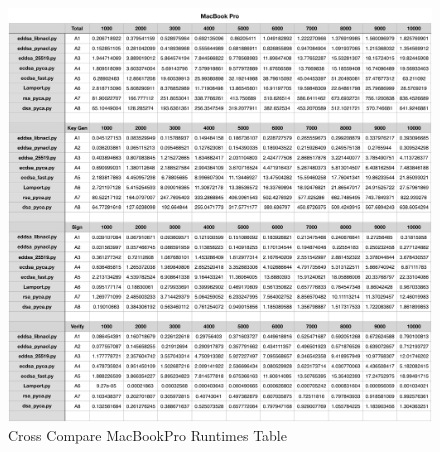 \documentclass[10pt,sigconf]{acmart}
\begin{document}
\begin{figure}
\centering
\includegraphics[scale=0.5]{Cross_Compare_MacBookPro_Runtimes}
\caption{\small{Cross Compare MacBookPro Runtimes Table}}
\label{fig:Cross_Compare_MacBookPro_Runtimes}
\end{figure}

\twocolumn



\end{document}
